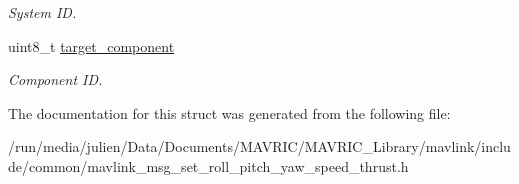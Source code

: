 \begin{DoxyCompactItemize}
\begin{DoxyCompactList}\small\item\em System I\+D. \end{DoxyCompactList}\item 
\hypertarget{struct____mavlink__set__roll__pitch__yaw__speed__thrust__t_a5b687c149bcad6c9b0bb53e489bff0a0}{uint8\+\_\+t \hyperlink{struct____mavlink__set__roll__pitch__yaw__speed__thrust__t_a5b687c149bcad6c9b0bb53e489bff0a0}{target\+\_\+component}}\label{struct____mavlink__set__roll__pitch__yaw__speed__thrust__t_a5b687c149bcad6c9b0bb53e489bff0a0}

\begin{DoxyCompactList}\small\item\em Component I\+D. \end{DoxyCompactList}\end{DoxyCompactItemize}


The documentation for this struct was generated from the following file\+:\begin{DoxyCompactItemize}
\item 
/run/media/julien/\+Data/\+Documents/\+M\+A\+V\+R\+I\+C/\+M\+A\+V\+R\+I\+C\+\_\+\+Library/mavlink/include/common/mavlink\+\_\+msg\+\_\+set\+\_\+roll\+\_\+pitch\+\_\+yaw\+\_\+speed\+\_\+thrust.\+h\end{DoxyCompactItemize}
